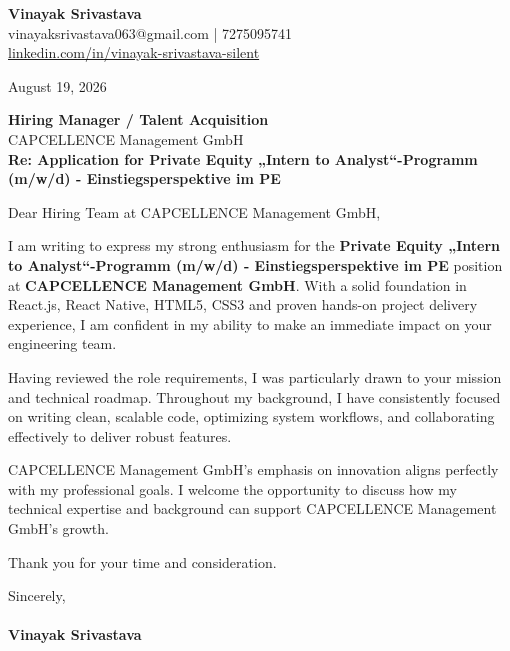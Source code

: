 \documentclass[11pt,a4paper]{article}
\begin{document}
\thispagestyle{empty}

{\Large \textbf{Vinayak Srivastava}}\\
vinayaksrivastava063@gmail.com | 7275095741 \\
\url{linkedin.com/in/vinayak-srivastava-silent}

\vspace{1em}
\hfill August 19, 2026

\textbf{Hiring Manager / Talent Acquisition}\\
CAPCELLENCE Management GmbH\\

\vspace{1.5em}
\textbf{Re: Application for Private Equity „Intern to Analyst“-Programm (m/w/d) - Einstiegsperspektive im PE}

\vspace{1em}
Dear Hiring Team at CAPCELLENCE Management GmbH,

I am writing to express my strong enthusiasm for the \textbf{Private Equity „Intern to Analyst“-Programm (m/w/d) - Einstiegsperspektive im PE} position at \textbf{CAPCELLENCE Management GmbH}. With a solid foundation in React.js, React Native, HTML5, CSS3 and proven hands-on project delivery experience, I am confident in my ability to make an immediate impact on your engineering team.

Having reviewed the role requirements, I was particularly drawn to your mission and technical roadmap. Throughout my background, I have consistently focused on writing clean, scalable code, optimizing system workflows, and collaborating effectively to deliver robust features.

CAPCELLENCE Management GmbH's emphasis on innovation aligns perfectly with my professional goals. I welcome the opportunity to discuss how my technical expertise and background can support CAPCELLENCE Management GmbH's growth.

Thank you for your time and consideration.

\vspace{1.5em}
Sincerely,\\
\vspace{1em}\\
\textbf{Vinayak Srivastava}
\end{document}
